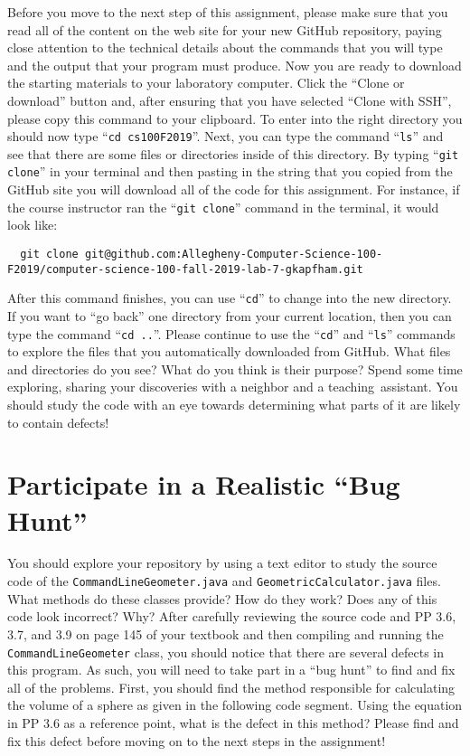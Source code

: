 \documentclass[11pt]{article}
\newcommand{\command}[1]{``\lstinline{#1}''}
\newcommand{\step}[1]{``{#1}''}
\begin{document}
Before you move to the next step of this assignment, please make sure that you
read all of the content on the web site for your new GitHub repository, paying
close attention to the technical details about the commands that you will type
and the output that your program must produce. Now you are ready to download the
starting materials to your laboratory computer. Click the ``Clone or download''
button and, after ensuring that you have selected ``Clone with SSH'', please
copy this command to your clipboard. To enter into the right directory you
should now type \command{cd cs100F2019}. Next, you can type the command
\command{ls} and see that there are some files or directories inside of this
directory. By typing \command{git clone} in your terminal and then pasting in
the string that you copied from the GitHub site you will download all of the
code for this assignment. For instance, if the course instructor ran the
\command{git clone} command in the terminal, it would look like:

\begin{lstlisting}
  git clone git@github.com:Allegheny-Computer-Science-100-F2019/computer-science-100-fall-2019-lab-7-gkapfham.git
\end{lstlisting}

After this command finishes, you can use \command{cd} to change into the new
directory. If you want to \step{go back} one directory from your current
location, then you can type the command \command{cd ..}. Please continue to use
the \command{cd} and \command{ls} commands to explore the files that you
automatically downloaded from GitHub. What files and directories do you see?
What do you think is their purpose? Spend some time exploring, sharing your
discoveries with a neighbor and a \mbox{teaching assistant}. You should study
the code with an eye towards determining what parts of it are likely to contain
defects!

\section*{Participate in a Realistic ``Bug Hunt''}

You should explore your repository by using a text editor to study the source
code of the {\tt CommandLineGeometer.java} and {\tt GeometricCalculator.java}
files. What methods do these classes provide? How do they work? Does any of this
code look incorrect? Why? After carefully reviewing the source code and PP 3.6,
3.7, and 3.9 on page 145 of your textbook and then compiling and running the
{\tt CommandLineGeometer} class, you should notice that there are several
defects in this program. As such, you will need to take part in a ``bug hunt''
to find and fix all of the problems. First, you should find the method
responsible for calculating the volume of a sphere as given in the following
code segment. Using the equation in PP 3.6 as a reference point, what is the
defect in this method? Please find and fix this defect before moving on to the
next steps in the assignment!
\end{document}
